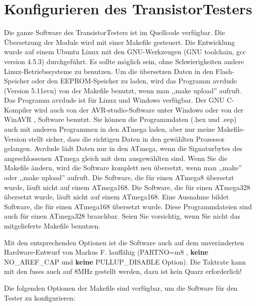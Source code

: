 \chapter{Konfigurieren des TransistorTesters}
\label{sec:config}
Die ganze Software des TransistorTesters ist im Quellcode verfügbar.
Die Übersetzung der Module wird mit einer Makefile gesteuert. Die Entwicklung wurde
auf einem Ubuntu Linux mit den GNU-Werkzeugen (GNU toolchain, gcc version 4.5.3) durchgeführt.
Es sollte möglich sein, ohne Schwierigkeiten andere Linux-Betriebssysteme zu benutzen.
Um die übersetzen Daten in den Flash-Speicher oder den EEPROM-Speicher zu laden, wird das
Programm avrdude \cite{avrdude} (Version 5.11svn) von der Makefile benutzt, wenn man ,,make upload'' aufruft.
Das Programm avrdude ist für Linux und Windows verfügbar.
Der GNU C-Kompiler wird auch von der AVR-studio-Software unter Windows oder von
der WinAVR \cite{winavr1},\cite{winavr2} Software benutzt.
Sie können die Programmdaten (.hex und .eep) auch mit anderen Programmen in den ATmega laden,
aber nur meine Makefile-Version stellt sicher, dass die richtigen Daten in den gewählten Prozessor gelangen.
Avrdude lädt Daten nur in den ATmega, wenn die Signaturbytes des angeschlossenen ATmega gleich mit dem ausgewählten sind.
Wenn Sie die Makefile ändern, wird die Software komplett neu übersetzt, wenn man ,,make'' oder
,,make upload'' aufruft.
Die Software, die für einen ATmega8 übersetzt wurde, läuft nicht auf einem ATmega168.
Die Software, die für einen ATmega328 übersetzt wurde, läuft nicht auf einem ATmega168.
Eine Ausnahme bildet Software, die für einen ATmega168 übersetzt wurde. Diese Programmdateien
sind auch für einen ATmega328 brauchbar.
Seien Sie vorsichtig, wenn Sie nicht das mitgelieferte Makefile benutzen.

Mit den entsprechenden Optionen ist die Software auch auf dem unveränderten Hardware-Entwurf von
Markus F. lauffähig (PARTNO=m8 , {\bf keine} NO\_AREF\_CAP und {\bf keine} PULLUP\_DISABLE Option).
Die Taktrate kann mit den fuses auch auf 8MHz gestellt werden, dazu ist kein Quarz erforderlich!


Die folgenden Optionen der Makefile sind verfügbar, um die Software für den Tester zu konfigurieren:

